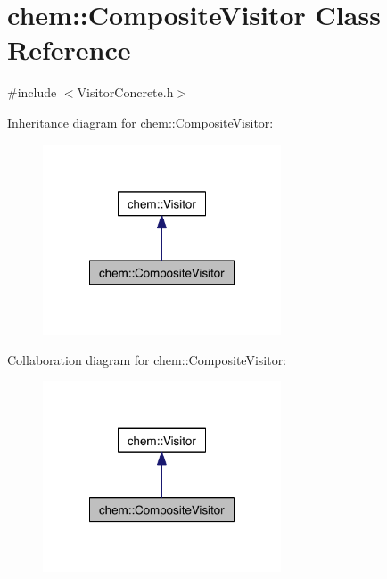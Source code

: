 \hypertarget{classchem_1_1CompositeVisitor}{\section{chem\-:\-:Composite\-Visitor Class Reference}
\label{classchem_1_1CompositeVisitor}
}


{\ttfamily \#include $<$Visitor\-Concrete.\-h$>$}



Inheritance diagram for chem\-:\-:Composite\-Visitor\-:
\nopagebreak
\begin{figure}[H]
\begin{center}
\leavevmode
\includegraphics[width=200pt]{classchem_1_1CompositeVisitor__inherit__graph}
\end{center}
\end{figure}


Collaboration diagram for chem\-:\-:Composite\-Visitor\-:
\nopagebreak
\begin{figure}[H]
\begin{center}
\leavevmode
\includegraphics[width=200pt]{classchem_1_1CompositeVisitor__coll__graph}
\end{center}
\end{figure}
